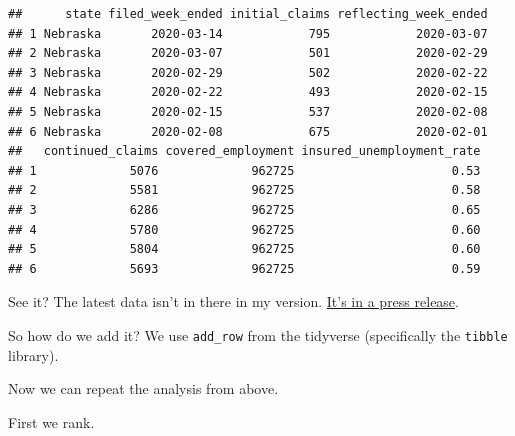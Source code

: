 \documentclass[]{book}
\newenvironment{Shaded}{\begin{snugshade}}{\end{snugshade}}
\newcommand{\DataTypeTok}[1]{\textcolor[rgb]{0.13,0.29,0.53}{#1}}
\newcommand{\DecValTok}[1]{\textcolor[rgb]{0.00,0.00,0.81}{#1}}
\newcommand{\KeywordTok}[1]{\textcolor[rgb]{0.13,0.29,0.53}{\textbf{#1}}}
\newcommand{\NormalTok}[1]{#1}
\newcommand{\OperatorTok}[1]{\textcolor[rgb]{0.81,0.36,0.00}{\textbf{#1}}}
\newcommand{\StringTok}[1]{\textcolor[rgb]{0.31,0.60,0.02}{#1}}
\begin{document}
\begin{verbatim}
##      state filed_week_ended initial_claims reflecting_week_ended
## 1 Nebraska       2020-03-14            795            2020-03-07
## 2 Nebraska       2020-03-07            501            2020-02-29
## 3 Nebraska       2020-02-29            502            2020-02-22
## 4 Nebraska       2020-02-22            493            2020-02-15
## 5 Nebraska       2020-02-15            537            2020-02-08
## 6 Nebraska       2020-02-08            675            2020-02-01
##   continued_claims covered_employment insured_unemployment_rate
## 1             5076             962725                      0.53
## 2             5581             962725                      0.58
## 3             6286             962725                      0.65
## 4             5780             962725                      0.60
## 5             5804             962725                      0.60
## 6             5693             962725                      0.59
\end{verbatim}

See it? The latest data isn't in there in my version. \href{https://www.dol.gov/sites/dolgov/files/OPA/newsreleases/ui-claims/20200510.pdf}{It's in a press release}.

So how do we add it? We use \texttt{add\_row} from the tidyverse (specifically the \texttt{tibble} library).

\begin{Shaded}
\end{Shaded}

Now we can repeat the analysis from above.

First we rank.

\begin{Shaded}
\end{Shaded}
\end{document}
